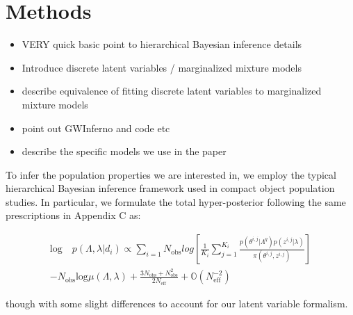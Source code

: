 \section{Methods} \label{sec:methods}

\begin{itemize}
    \item VERY quick basic point to hierarchical Bayesian inference details
    \item Introduce discrete latent variables / marginalized mixture models
    \item describe equivalence of fitting discrete latent variables to marginalized mixture models
    \item point out GWInferno and code etc
    \item describe the specific models we use in the paper
\end{itemize}

To infer the population properties we are interested in, we employ the typical hierarchical Bayesian inference framework used in compact object population studies. In particular, we formulate the total hyper-posterior following the same prescriptions in \citet{2210.12834} Appendix C as:

\begin{align}
    \text{log} \quad p(\Lambda, \lambda | {d_i}) \propto \sum_{i=1}{N_\text{obs}} log \left[ \frac{1}{K_i} \sum_{j=1}^{K_i} \frac{p(\theta^{i,j} | \Lambda^q) p(z^{i,j} | \lambda)}{\pi (\theta^{i,j}, z^{i,j})} \right] \\ - N_\text{obs} \text{log} \mu(\Lambda, \lambda) + \frac{3N_\text{obs}+N^2_{\text{obs}}}{2N_{\text{eff}}} + \mathbb{O}(N^{-2}_{\text{eff}})
\end{align}

though with some slight differences to account for our latent variable formalism. 